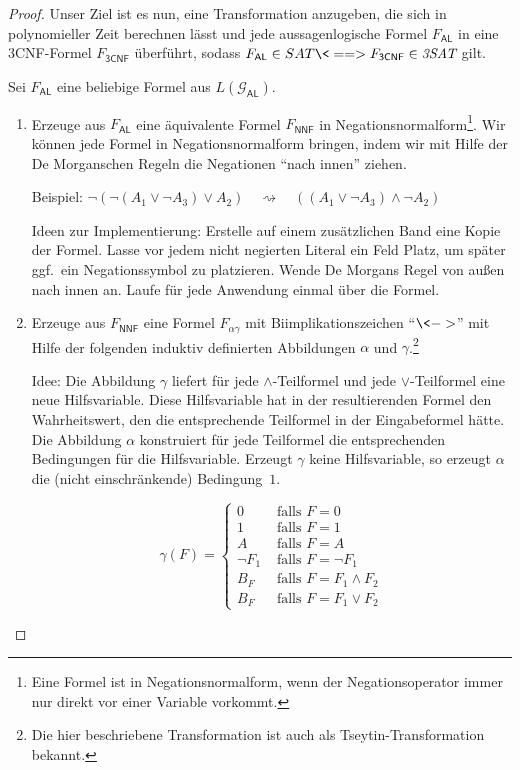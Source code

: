 \begin{proof}
Unser Ziel ist es nun, eine Transformation anzugeben, die sich in polynomieller Zeit berechnen lässt und jede aussagenlogische Formel $F_\mathsf{AL}$ in eine 3CNF-Formel $F_\mathsf{3CNF}$ überführt, sodass
$F_\mathsf{AL}\in SAT \<==> F_\mathsf{3CNF}\in \textit{3SAT}$
gilt.

Sei $F_\mathsf{AL}$ eine beliebige Formel aus $L(\mathcal{G}_\mathsf{AL})$.

\begin{enumerate}
 \item Erzeuge aus $F_\mathsf{AL}$ eine äquivalente Formel $F_\mathsf{NNF}$ in Negationsnormalform\footnote{Eine Formel ist in Negationsnormalform, wenn der Negationsoperator immer nur direkt vor einer Variable vorkommt.}.
 Wir können jede Formel in Negationsnormalform bringen, indem wir mit Hilfe der De Morganschen Regeln die Negationen "`nach innen"' ziehen.
 
 Beispiel: $\neg(\neg (A_1\lor \neg A_3)\lor A_2) \quad\rightsquigarrow\quad ((A_1\lor \neg A_3)\land \neg A_2)$
 
 Ideen zur Implementierung: Erstelle auf einem zusätzlichen Band eine Kopie der Formel.
 Lasse vor jedem nicht negierten Literal ein Feld Platz, um später ggf.\ ein Negationssymbol zu platzieren.
 Wende De Morgans Regel von außen nach innen an.
 Laufe für jede Anwendung einmal über die Formel.
 
 
 \item Erzeuge aus $F_\mathsf{NNF}$ eine Formel $F_{\alpha\gamma}$ mit Biimplikationszeichen "`$\<->$"' mit Hilfe der folgenden induktiv definierten Abbildungen $\alpha$ und $\gamma$.\footnote{%
 Die hier beschriebene Transformation ist auch als Tseytin-Transformation bekannt.}
 
 Idee: Die Abbildung $\gamma$ liefert für jede $\land$-Teilformel und jede $\lor$-Teilformel eine neue Hilfsvariable.
 Diese Hilfsvariable hat in der resultierenden Formel den Wahrheitswert, den die entsprechende Teilformel in der Eingabeformel hätte.
 Die Abbildung $\alpha$ konstruiert für jede Teilformel die entsprechenden Bedingungen für die Hilfsvariable.
 Erzeugt $\gamma$ keine Hilfsvariable, so erzeugt $\alpha$ die (nicht einschränkende) Bedingung~$1$.
 
 $$\gamma(F)=
 \begin{cases}
   0 & \text{ falls } F=0\\
   1 & \text{ falls } F=1\\
   A & \text{ falls } F=A\\
   \neg F_1 & \text{ falls } F=\neg F_1\\
   B_F & \text{ falls } F=F_1\land F_2\\
   B_F & \text{ falls } F=F_1\lor F_2
  \end{cases}$$
 

\end{enumerate}
\end{proof}

